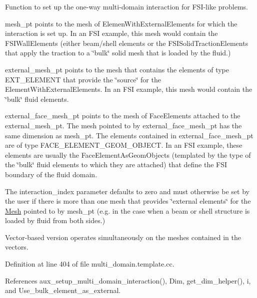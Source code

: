 Function to set up the one-\/way multi-\/domain interaction for F\+S\+I-\/like problems.
\begin{DoxyItemize}
\item {\ttfamily mesh\+\_\+pt} points to the mesh of {\ttfamily Elemen\+With\+External\+Elements} for which the interaction is set up. In an F\+SI example, this mesh would contain the {\ttfamily F\+S\+I\+Wall\+Elements} (either beam/shell elements or the {\ttfamily F\+S\+I\+Solid\+Traction\+Elements} that apply the traction to a \char`\"{}bulk\char`\"{} solid mesh that is loaded by the fluid.)
\item {\ttfamily external\+\_\+mesh\+\_\+pt} points to the mesh that contains the elements of type E\+X\+T\+\_\+\+E\+L\+E\+M\+E\+NT that provide the \char`\"{}source\char`\"{} for the {\ttfamily Element\+With\+External\+Elements}. In an F\+SI example, this mesh would contain the \char`\"{}bulk\char`\"{} fluid elements.
\item {\ttfamily external\+\_\+face\+\_\+mesh\+\_\+pt} points to the mesh of {\ttfamily Face\+Elements} attached to the {\ttfamily external\+\_\+mesh\+\_\+pt}. The mesh pointed to by {\ttfamily external\+\_\+face\+\_\+mesh\+\_\+pt} has the same dimension as {\ttfamily mesh\+\_\+pt}. The elements contained in {\ttfamily external\+\_\+face\+\_\+mesh\+\_\+pt} are of type F\+A\+C\+E\+\_\+\+E\+L\+E\+M\+E\+N\+T\+\_\+\+G\+E\+O\+M\+\_\+\+O\+B\+J\+E\+CT. In an F\+SI example, these elements are usually the {\ttfamily Face\+Element\+As\+Geom\+Objects} (templated by the type of the \char`\"{}bulk\char`\"{} fluid elements to which they are attached) that define the F\+SI boundary of the fluid domain.
\item The interaction\+\_\+index parameter defaults to zero and must otherwise be set by the user if there is more than one mesh that provides \char`\"{}external
  elements\char`\"{} for the \hyperlink{classoomph_1_1Mesh}{Mesh} pointed to by mesh\+\_\+pt (e.\+g. in the case when a beam or shell structure is loaded by fluid from both sides.)
\end{DoxyItemize}Vector-\/based version operates simultaneously on the meshes contained in the vectors. 

Definition at line 404 of file multi\+\_\+domain.\+template.\+cc.



References aux\+\_\+setup\+\_\+multi\+\_\+domain\+\_\+interaction(), Dim, get\+\_\+dim\+\_\+helper(), i, and Use\+\_\+bulk\+\_\+element\+\_\+as\+\_\+external.

